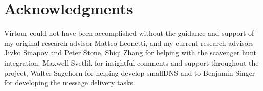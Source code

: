 \documentclass[
  oneside,
  11pt, a4paper,
  footinclude=true,
  headinclude=true,
  cleardoublepage=empty
]{article}
\begin{document}
\section{Acknowledgments}\label{sec:acks}

Virtour could not have been accomplished without the guidance and support of my
original research advisor Matteo Leonetti, and my current research advisors
Jivko Sinapov and Peter Stone. Shiqi Zhang for helping with the scavenger hunt
integration. Maxwell Svetlik for insightful comments and support throughout the
project, Walter Sagehorn for helping develop smallDNS and to Benjamin Singer
for developing the message delivery tasks.



    
\end{document}
